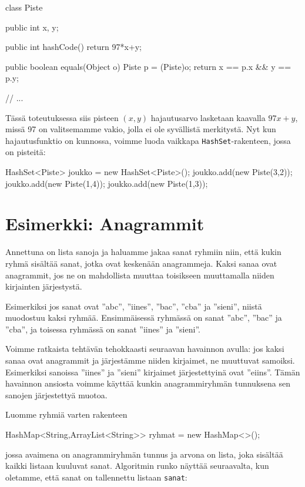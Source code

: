 \begin{code}
class Piste {
    public int x, y;

    public int hashCode() {
        return 97*x+y;
    }
    
    public boolean equals(Object o) {
        Piste p = (Piste)o;
        return x == p.x && y == p.y;
    }

    // ...
}
\end{code}

Tässä toteutuksessa siis pisteen $(x,y)$ hajautusarvo lasketaan
kaavalla $97x+y$, missä 97 on valitsemamme vakio, jolla ei ole
syvällistä merkitystä.
Nyt kun hajautusfunktio on kunnossa,
voimme luoda vaikkapa \texttt{HashSet}-rakenteen, jossa on pisteitä:

\begin{code}
HashSet<Piste> joukko = new HashSet<Piste>();
joukko.add(new Piste(3,2));
joukko.add(new Piste(1,4));
joukko.add(new Piste(1,3));
\end{code}

\section{Esimerkki: Anagrammit}

Annettuna on lista sanoja ja haluamme jakaa sanat ryhmiin niin,
että kukin ryhmä sisältää sanat, jotka ovat keskenään anagrammeja.
Kaksi sanaa ovat anagrammit, jos ne on mahdollista muuttaa toisikseen
muuttamalla niiden kirjainten järjestystä.

Esimerkiksi jos sanat ovat ''abc'', ''iines'', ''bac'', ''cba'' ja ''sieni'',
niistä muodostuu kaksi ryhmää.
Ensimmäisessä ryhmässä on sanat ''abc'', ''bac'' ja ''cba'',
ja toisessa ryhmässä on sanat ''iines'' ja ''sieni''.

Voimme ratkaista tehtävän tehokkaasti seuraavan havainnon avulla:
jos kaksi sanaa ovat anagrammit ja järjestämme niiden kirjaimet,
ne muuttuvat samoiksi.
Esimerkiksi sanoissa ''iines'' ja ''sieni'' kirjaimet
järjestettyinä ovat ''eiins''.
Tämän havainnon ansiosta voimme käyttää kunkin anagrammiryhmän
tunnuksena sen sanojen järjestettyä muotoa.

Luomme ryhmiä varten rakenteen

\begin{code}
HashMap<String,ArrayList<String>> ryhmat = new HashMap<>();
\end{code}

jossa avaimena on anagrammiryhmän tunnus ja arvona on lista,
joka sisältää kaikki listaan kuuluvat sanat.
Algoritmin runko näyttää seuraavalta, kun oletamme,
että sanat on tallennettu listaan \texttt{sanat}:

